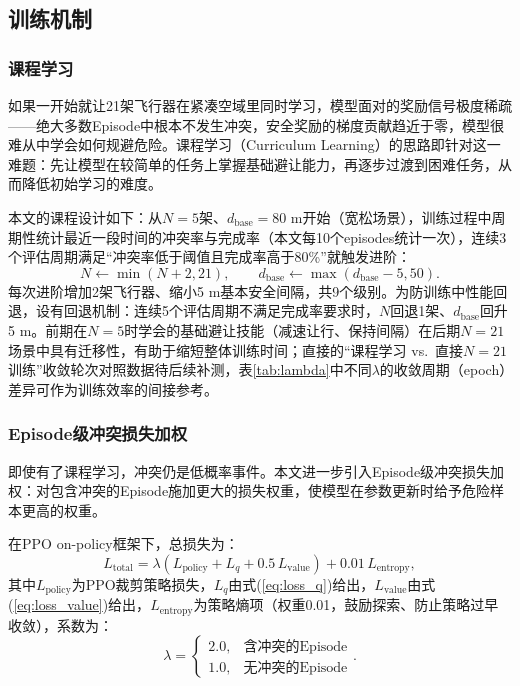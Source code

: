 \documentclass[12pt,a4paper,UTF8]{ctexart}
\begin{document}
\subsection{训练机制}

\subsubsection{课程学习}

如果一开始就让21架飞行器在紧凑空域里同时学习，模型面对的奖励信号极度稀疏——绝大多数Episode中根本不发生冲突，安全奖励的梯度贡献趋近于零，模型很难从中学会如何规避危险。课程学习（Curriculum Learning）\cite{ref39}的思路即针对这一难题：先让模型在较简单的任务上掌握基础避让能力，再逐步过渡到困难任务，从而降低初始学习的难度。

本文的课程设计如下：从$N=5$架、$d_{\text{base}}=80$ m开始（宽松场景），训练过程中周期性统计最近一段时间的冲突率与完成率（本文每10个episodes统计一次），连续3个评估周期满足“冲突率低于阈值且完成率高于80\%”就触发进阶：
\begin{equation}
    N \leftarrow \min(N+2, 21), \qquad d_{\text{base}} \leftarrow \max(d_{\text{base}}-5, 50).
    \label{eq:curriculum}
\end{equation}
每次进阶增加2架飞行器、缩小5 m基本安全间隔，共9个级别。为防训练中性能回退，设有回退机制：连续5个评估周期不满足完成率要求时，$N$回退1架、$d_{\text{base}}$回升5 m。前期在$N=5$时学会的基础避让技能（减速让行、保持间隔）在后期$N=21$场景中具有迁移性，有助于缩短整体训练时间；直接的“课程学习 vs.\ 直接$N=21$训练”收敛轮次对照数据待后续补测，表\ref{tab:lambda}中不同$\lambda$的收敛周期（epoch）差异可作为训练效率的间接参考。

\subsubsection{Episode级冲突损失加权}

即使有了课程学习，冲突仍是低概率事件。本文进一步引入Episode级冲突损失加权：对包含冲突的Episode施加更大的损失权重，使模型在参数更新时给予危险样本更高的权重。

在PPO\cite{ref30} on-policy框架下，总损失为：
\begin{equation}
    L_{\text{total}} = \lambda\left(L_{\text{policy}} + L_{q} + 0.5\,L_{\text{value}}\right) + 0.01\,L_{\text{entropy}},
    \label{eq:total_loss}
\end{equation}
其中$L_{\text{policy}}$为PPO裁剪策略损失，$L_{q}$由式(\ref{eq:loss_q})给出，$L_{\text{value}}$由式(\ref{eq:loss_value})给出，$L_{\text{entropy}}$为策略熵项（权重0.01，鼓励探索、防止策略过早收敛），系数为：
\begin{equation}
    \lambda = \begin{cases}
        2.0, & \text{含冲突的Episode}\\
        1.0, & \text{无冲突的Episode}
    \end{cases}.
    \label{eq:lambda}
\end{equation}
\end{document}
